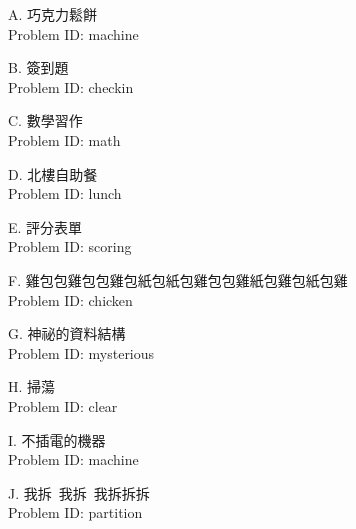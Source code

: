 \documentclass[12pt]{article}
\newcommand{\probtitle}[3]{
    \clearpage
    \begin{center}
        \huge
        #1. #2 \\
        \normalsize
        Problem ID: #3
    \end{center}
}
\begin{document}
\clearpage

\probtitle{A}{巧克力鬆餅}{machine}


\probtitle{B}{簽到題}{checkin}


\probtitle{C}{數學習作}{math}


\probtitle{D}{北樓自助餐}{lunch}


\probtitle{E}{評分表單}{scoring}


\probtitle{F}{\Large 雞包包雞包包雞包紙包紙包雞包包雞紙包雞包紙包雞}{chicken}


\probtitle{G}{神祕的資料結構}{mysterious}


\probtitle{H}{掃蕩}{clear}


\probtitle{I}{不插電的機器}{machine}


\probtitle{J}{我拆~我拆~我拆拆拆}{partition}

\end{document}
